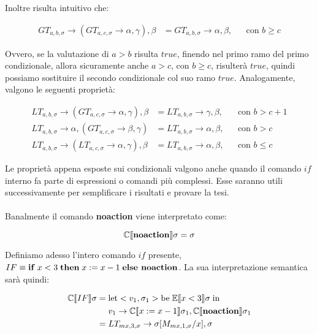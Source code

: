     Inoltre risulta intuitivo che:
    
    \begin{align*}
        GT_{a,b,\sigma} \rightarrow (GT_{a,c,\sigma} \rightarrow \alpha, \gamma), \beta &= GT_{a,b,\sigma} \rightarrow \alpha, \beta, &&\mbox{con $b\geq c$}
    \end{align*}
    
    Ovvero, se la valutazione di $a>b$ risulta $true$, finendo nel primo ramo del primo condizionale, allora sicuramente anche $a>c$, con $b \geq c$, risulterà $true$, quindi possiamo sostituire il secondo condizionale col suo ramo $true$. Analogamente, valgono le seguenti proprietà:
    
    \begin{align*}
        LT_{a,b,\sigma} \rightarrow (GT_{a,c,\sigma} \rightarrow \alpha, \gamma), \beta &= LT_{a,b,\sigma} \rightarrow \gamma, \beta, &&\mbox{con $b > c+1$}\\
        LT_{a,b,\sigma} \rightarrow \alpha, (GT_{a,c,\sigma} \rightarrow \beta, \gamma) &= LT_{a,b,\sigma} \rightarrow \alpha, \beta, &&\mbox{con $b > c$}\\
        LT_{a,b,\sigma} \rightarrow (LT_{a,c,\sigma} \rightarrow \alpha, \gamma), \beta &= LT_{a,b,\sigma} \rightarrow \alpha, \beta, &&\mbox{con $b\leq c$}
    \end{align*}
    
    Le proprietà appena esposte sui condizionali valgono anche quando il comando $if$ interno fa parte di espressioni o comandi più complessi. Esse saranno utili successivamente per semplificare i risultati e provare la tesi.\\
    \\
    Banalmente il comando \textbf{noaction} viene interpretato come:
    
    \begin{equation*}
        \mathbb{C}\llbracket \mbox{\textbf{noaction}} \rrbracket\sigma = \sigma
    \end{equation*}
    
    Definiamo adesso l'intero comando $if$ presente, $IF \equiv \mbox{\textbf{if}}\; x<3\; \mbox{\textbf{then}}\; x:=x-1\; \mbox{\textbf{else noaction}}$. La sua interpretazione semantica sarà quindi:
    
    \begin{align*}
        \mathbb{C}\llbracket IF \rrbracket\sigma =\;& \mbox{let} <v_1,\sigma_1> \mbox{be}\; \mathbb{E}\llbracket x<3 \rrbracket\sigma\; \mbox{in}\\
        & v_1\rightarrow\mathbb{C}\llbracket x:=x-1 \rrbracket\sigma_1,\mathbb{C}\llbracket \mbox{\textbf{noaction}} \rrbracket\sigma_1\\
        =\;& LT_{mx,3,\sigma}\rightarrow \sigma[M_{mx,1,\sigma}/x], \sigma
    \end{align*}
    
